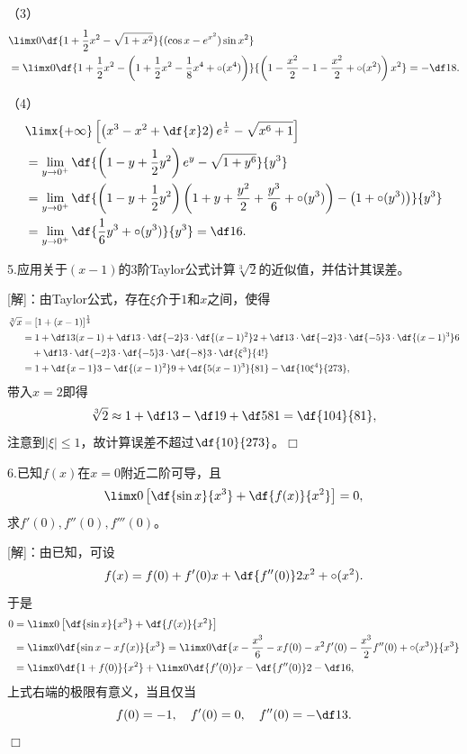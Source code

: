 （3）
\begin{align*}
	&\limx0\df{1+\frac12x^2-\sqrt{1+x^2}}{(\cos x-e^{x^2})\sin x^2}\\
	&=\limx0\df{1+\frac12x^2-\left(1+\frac12x^2-\frac18x^4+\circ(x^4)\right)}
	{\left(1-\frac{x^2}2-1-\frac{x^2}2+\circ(x^2)\right)x^2}=-\df18.
\end{align*}

（4）
\begin{align*}
	&\limx{+\infty}\left[\left(x^3-x^2+\df{x}2\right)e^{\frac1x}
	-\sqrt{x^6+1}\right]\\
	&=\lim\limits_{y\to0^+}\df{\left(1-y+\frac12y^2
	\right)e^y-\sqrt{1+y^6}}{y^3}\\
	&=\lim\limits_{y\to0^+}\df{\left(1-y+\frac12y^2
	\right)\left(1+y+\frac{y^2}2+\frac{y^3}6+\circ(y^3)\right)
	-\left(1+\circ(y^3)\right)}{y^3}\\
	&=\lim\limits_{y\to0^+}\df{\frac16y^3+\circ(y^3)}{y^3}=\df16.
\end{align*}

5.应用关于$(x-1)$的$3$阶Taylor公式计算$\sqrt[3]{2}$的近似值，并估计其误差。

[解]：由Taylor公式，存在$\xi$介于$1$和$x$之间，使得
\begin{align*}
	\sqrt[3]x&=[1+(x-1)]^{\frac13}\\
	&=1+\df13(x-1)
	+\df13\cdot\df{-2}3\cdot\df{(x-1)^2}2
	+\df13\cdot\df{-2}3\cdot\df{-5}3\cdot\df{(x-1)^3}6\\
	&\quad+\df13\cdot\df{-2}3\cdot\df{-5}3\cdot\df{-8}3\cdot\df{\xi^3}{4!}\\
	&=1+\df{x-1}3-\df{(x-1)^2}9+\df{5(x-1)^3}{81}-\df{10\xi^4}{273},
\end{align*}
带入$x=2$即得
$$\sqrt[3]2\approx1+\df13-\df19+\df5{81}=\df{104}{81},$$
注意到$|\xi|\leq 1$，故计算误差不超过$\df{10}{273}$。\hfill$\Box$

\bigskip

6.已知$f(x)$在$x=0$附近二阶可导，且
$$\limx0\left[\df{\sin x}{x^3}+\df{f(x)}{x^2}\right]=0,$$
求$f'(0),f''(0),f'''(0)$。

[解]：由已知，可设
$$f(x)=f(0)+f'(0)x+\df{f''(0)}2x^2+\circ(x^2).$$
于是
\begin{align*}
	0&=\limx0\left[\df{\sin x}{x^3}+\df{f(x)}{x^2}\right]\\
	&=\limx0\df{\sin x-xf(x)}{x^3}
	=\limx0\df{x-\frac{x^3}6-xf(0)-x^2f'(0)-\frac{x^3}2f''(0)+\circ(x^3)}{x^3}\\
	&=\limx0\df{1+f(0)}{x^2}+\limx0\df{f'(0)}x-\df{f''(0)}2-\df16,
\end{align*}
上式右端的极限有意义，当且仅当
$$f(0)=-1,\quad f'(0)=0,\quad f''(0)=-\df13.$$
\hfill$\Box$

